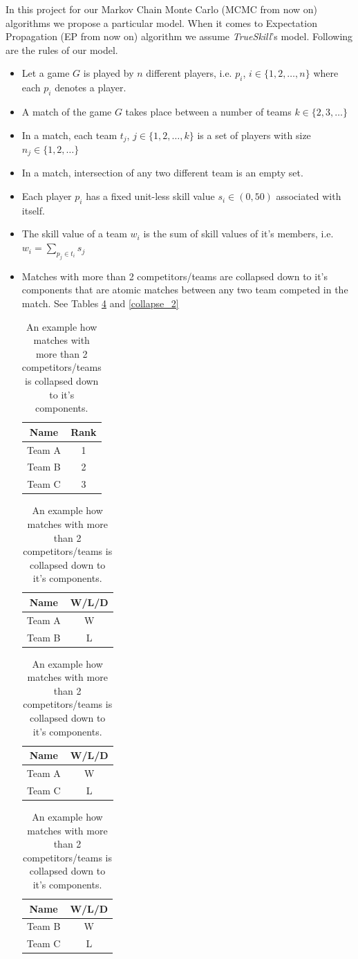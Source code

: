 \documentclass[12pt]{article}
\begin{document}
In this project for our Markov Chain Monte Carlo (MCMC from now on) algorithms we propose a particular model. When it comes to Expectation Propagation (EP from now on) algorithm we assume \textit{TrueSkill}'s model. Following are the rules of our model.
\begin{itemize}
	\singlespacing
	\item Let a game $G$ is played by $n$ different players, i.e. $p_i$, $i \in \{1,2,\dots,n\}$ where each $p_i$ denotes a player. 
	\item A match of the game $G$ takes place between a number of teams $k \in \{2,3,\dots\}$
	\item In a match, each team $t_j$, $j \in \{1,2,\dots,k\}$ is a set of players with size $n_j \in \{1,2,\dots\}$
	\item In a match, intersection of any two different team is an empty set.
	\item Each player $p_i$ has a fixed unit-less skill value $s_i \in (0,50)$ associated with itself.
	\item The skill value of a team $w_i$ is the sum of skill values of it's members, i.e. $w_i = \sum_{p_j \in t_i} s_j$
	\item Matches with more than 2 competitors/teams are collapsed down to it's components that are atomic matches between any two team competed in the match. See Tables \ref{collapse_1} and \ref{collapse_2}
	\begin{table}[!ht]
		\centering
		\begin{tabular}{@{}cc@{}}
			\toprule
			\textbf{Name} & \textbf{Rank} \\ \midrule
			Team A & 1 \\
			Team B & 2 \\
			Team C & 3 \\ \bottomrule
		\end{tabular}\hspace{5mm}
		\begin{tabular}{@{}cc@{}}
			\toprule
			\textbf{Name} & \textbf{W/L/D} \\ \midrule
			Team A & W \\
			Team B & L \\ \bottomrule
		\end{tabular} 
		\begin{tabular}{@{}cc@{}}
			\toprule
			\textbf{Name} & \textbf{W/L/D} \\ \midrule
			Team A & W \\
			Team C & L \\ \bottomrule
		\end{tabular}
		\begin{tabular}{@{}cc@{}}
			\toprule
			\textbf{Name} & \textbf{W/L/D} \\ \midrule
			Team B & W \\
			Team C & L \\ \bottomrule
		\end{tabular}
		\caption{An example how matches with more than 2 competitors/teams is collapsed down to it's components.}
		\label{collapse_1}
	\end{table}


\end{itemize}
\end{document}

